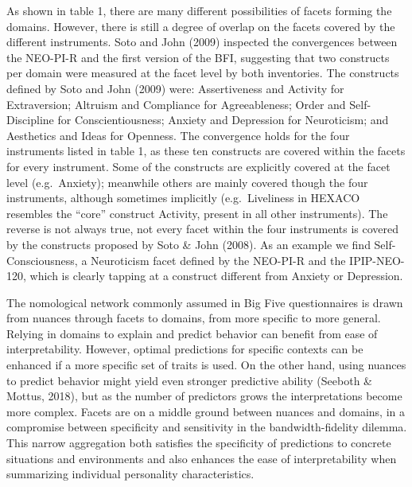\documentclass[,man,floatsintext]{apa6}
\theoremstyle{definition}
\theoremstyle{definition}
\theoremstyle{definition}
\theoremstyle{remark}
\begin{document}
As shown in table 1, there are many different possibilities of facets
forming the domains. However, there is still a degree of overlap on the
facets covered by the different instruments. Soto and John (2009)
inspected the convergences between the NEO-PI-R and the first version of
the BFI, suggesting that two constructs per domain were measured at the
facet level by both inventories. The constructs defined by Soto and John
(2009) were: Assertiveness and Activity for Extraversion; Altruism and
Compliance for Agreeableness; Order and Self-Discipline for
Conscientiousness; Anxiety and Depression for Neuroticism; and
Aesthetics and Ideas for Openness. The convergence holds for the four
instruments listed in table 1, as these ten constructs are covered
within the facets for every instrument. Some of the constructs are
explicitly covered at the facet level (e.g.~Anxiety); meanwhile others
are mainly covered though the four instruments, although sometimes
implicitly (e.g.~Liveliness in HEXACO resembles the \enquote{core}
construct Activity, present in all other instruments). The reverse is
not always true, not every facet within the four instruments is covered
by the constructs proposed by Soto \& John (2008). As an example we find
Self-Consciousness, a Neuroticism facet defined by the NEO-PI-R and the
IPIP-NEO-120, which is clearly tapping at a construct different from
Anxiety or Depression.

The nomological network commonly assumed in Big Five questionnaires is
drawn from nuances through facets to domains, from more specific to more
general. Relying in domains to explain and predict behavior can benefit
from ease of interpretability. However, optimal predictions for specific
contexts can be enhanced if a more specific set of traits is used. On
the other hand, using nuances to predict behavior might yield even
stronger predictive ability (Seeboth \& Mottus, 2018), but as the number
of predictors grows the interpretations become more complex. Facets are
on a middle ground between nuances and domains, in a compromise between
specificity and sensitivity in the bandwidth-fidelity dilemma. This
narrow aggregation both satisfies the specificity of predictions to
concrete situations and environments and also enhances the ease of
interpretability when summarizing individual personality
characteristics.
\end{document}
